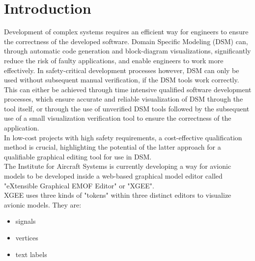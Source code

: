 \chapter{Introduction}
\label{chp:introduction}

Development of complex systems requires an efficient way for engineers to ensure the correctness of the developed software. Domain Specific Modeling (DSM) can, through automatic code generation and block-diagram visualizations, significantly reduce the risk of faulty applications, and enable engineers to work more effectively. In safety-critical development processes however, DSM can only be used without subsequent manual verification, if the DSM tools work correctly. This can either be achieved through time intensive qualified software development processes, which ensure accurate and reliable visualization of DSM through the tool itself, or through the use of unverified DSM tools followed by the subsequent use of a small visualization verification tool to ensure the correctness of the application.\\
In low-cost projects with high safety requirements, a cost-effective qualification method is crucial, highlighting the potential of the latter approach for a qualifiable graphical editing tool for use in DSM.\\
\newline
The Institute for Aircraft Systems is currently developing a way for avionic models to be developed inside a web-based graphical model editor called "eXtensible Graphical EMOF Editor" or "XGEE".\\
XGEE uses three kinds of "tokens" within three distinct editors to visualize avionic models. They are:
\begin{itemize}
    \item signals
    \item vertices
    \item text labels
\end{itemize}
